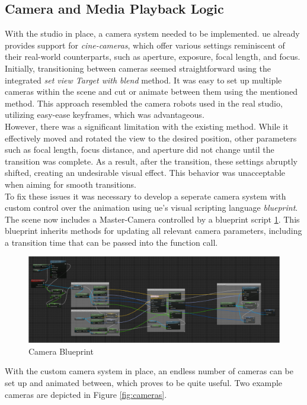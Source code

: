 \documentclass[
  a4paper,  %
  twoside,  %
  bibliography=totoc,
  headsepline,
  cleardoublepage=empty,
  parskip=half,
  draft=false
]{scrbook}
\begin{document}
\subsection*{Camera and Media Playback Logic} 
With the studio in place, a camera system needed to be implemented. \gls{ue} already provides support for \textit{cine-cameras}, which offer various settings reminiscent of their real-world counterparts, such as aperture, exposure, focal length, and focus. Initially, transitioning between cameras seemed straightforward using the integrated \textit{set view Target with blend} method. It was easy to set up multiple cameras within the scene and cut or animate between them using the mentioned method. This approach resembled the camera robots used in the real studio, utilizing easy-ease keyframes, which was advantageous. \\
However, there was a significant limitation with the existing method. While it effectively moved and rotated the view to the desired position, other parameters such as focal length, focus distance, and aperture did not change until the transition was complete. As a result, after the transition, these settings abruptly shifted, creating an undesirable visual effect. This behavior was unacceptable when aiming for smooth transitions. \\
To fix these issues it was necessary to develop a seperate camera system with custom control over the animation using \gls{ue}'s visual scripting language \textit{blueprint}. The scene now includes a Master-Camera controlled by a blueprint script \ref{fig:blueprint}. This blueprint inherits methods for updating all relevant camera parameters, including a transition time that can be passed into the function call.
\begin{figure}[h]
  \centering
  \includegraphics[width=1\textwidth]{graphics/images/unreal-engine/blueprint.png}
  \caption{Camera Blueprint}
  \label{fig:blueprint}
\end{figure}
With the custom camera system in place, an endless number of cameras can be set up and animated between, which proves to be quite useful. Two example cameras are depicted in Figure \ref{fig:cameras}.
\end{document}
